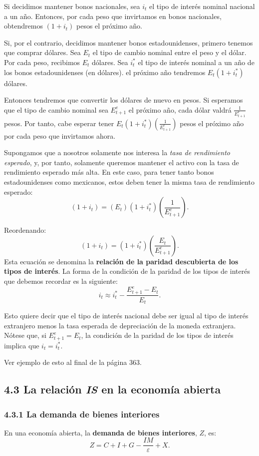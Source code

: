 \documentclass[10pt, landscape]{article}
\begin{document}
\begin{multicols*}{3}
Si decidimos mantener bonos nacionales, sea $i_t$ el tipo de interés nominal nacional a un año. Entonces, por cada peso que invirtamos en bonos nacionales, obtendremos $(1+i_t)$ pesos el próximo año.

Si, por el contrario, decidimos mantener bonos estadounidenses, primero tenemos que comprar dólares. Sea $E_t$ el tipo de cambio nominal entre el peso y el dólar. Por cada peso, recibimos $E_t$ dólares. Sea $i_t^*$ el tipo de interés nominal a un año de los bonos estadounidenses (en dólares). el próximo año tendremos $E_t(1+i_t^*)$ dólares. 

Entonces tendremos que convertir los dólares de nuevo en pesos. Si esperamos que el tipo de cambio nominal sea $E_{t+1}^e$ el próximo año, cada dólar valdrá $\frac{1}{E_{t+1}^e}$ pesos. Por tanto, cabe esperar tener $E_t(1+i_t^*)(\frac{1}{E_{t+1}^e})$ pesos el próximo año por cada peso que invirtamos ahora.

Supongamos que a nosotros solamente nos interesa la \textit{tasa de rendimiento esperado}, y, por tanto, solamente queremos mantener el activo con la tasa de rendimiento esperado más alta. En este caso, para tener tanto bonos estadounidenses como mexicanos, estos deben tener la misma tasa de rendimiento esperado:
\[ (1+i_t) = (E_t)(1+i_t^*)\left(\frac{1}{E_{t+1}^e}\right). \]

Reordenando:
\[ (1+i_t) = (1+i_t^*)\left(\frac{E_t}{E_{t+1}^e}\right).\]
Esta ecuación se denomina la \textbf{relación de la paridad descubierta de los tipos de interés}. La forma de la condición de la paridad de los tipos de interés que debemos recordar es la siguiente:
\[ i_t \approx i_t^* - \frac{E_{t+1}^e - E_t}{E_t}. \]

Esto quiere decir que el tipo de interés nacional debe ser igual al tipo de interés extranjero menos la tasa esperada de depreciación de la moneda extranjera. Nótese que, si $E_{t+1}^e = E_t$, la condición de la paridad de los tipos de interés implica que $i_t = i_t^*$.

Ver ejemplo de esto al final de la página 363.

\subsection{4.3 La relación \textit{IS} en la economía abierta}
\subsubsection{4.3.1 La demanda de bienes interiores}
En una economía abierta, la \textbf{demanda de bienes interiores}, $Z$, es:
\[ Z = C + I + G - \frac{IM}{\varepsilon}+X. \]


\end{multicols*}
\end{document}

